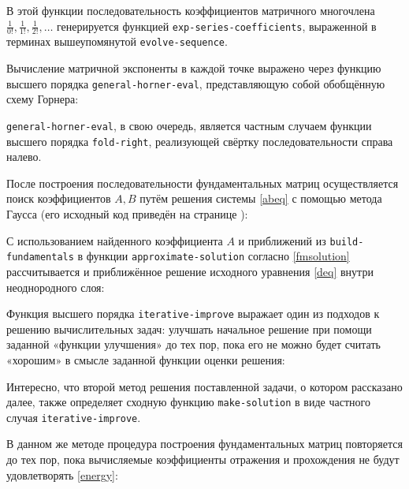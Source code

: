 \documentclass{article}
\newcommand{\procname}[1]{\texttt{#1}}
\numberwithin{equation}{section}
\begin{document}


В этой функции последовательность коэффициентов матричного многочлена
$\frac{1}{0!}, \frac{1}{1!}, \frac{1}{2!}, \dotsc$ генерируется
функцией \procname{exp-series-coefficients},
выраженной в терминах вышеупомянутой \procname{evolve-sequence}.

Вычисление матричной экспоненты в каждой точке выражено через
функцию высшего порядка \procname{general-horner-eval}, представляющую
собой обобщённую схему Горнера:



\procname{general-horner-eval}, в свою очередь, является частным случаем
функции высшего порядка \procname{fold-right}, реализующей свёртку
последовательности справа налево.

После построения последовательности фундаментальных матриц
осуществляется поиск коэффициентов $A, B$ путём решения системы
\eqref{abeq} с помощью метода Гаусса (его исходный код приведён на
странице \pageref{gauss.scm-full-listing}):



С использованием найденного коэффициента $A$ и приближений из
\procname{build-fundamentals} в функции
\procname{approximate-solution} согласно \eqref{fmsolution}
рассчитывается и приближённое решение исходного уравнения \eqref{deq}
внутри неоднородного слоя:



Функция высшего порядка \procname{iterative-improve} выражает один из
подходов к решению вычислительных задач: улучшать начальное решение
при помощи заданной «функции улучшения» до тех пор, пока его не можно
будет считать «хорошим» в смысле заданной функции оценки решения:



Интересно, что второй метод решения поставленной задачи, о котором
рассказано далее, также определяет сходную функцию
\procname{make-solution} в виде частного случая
\procname{iterative-improve}.

В данном же методе процедура построения фундаментальных матриц
повторяется до тех пор, пока вычисляемые коэффициенты отражения и
прохождения не будут удовлетворять \eqref{energy}:


\end{document}
